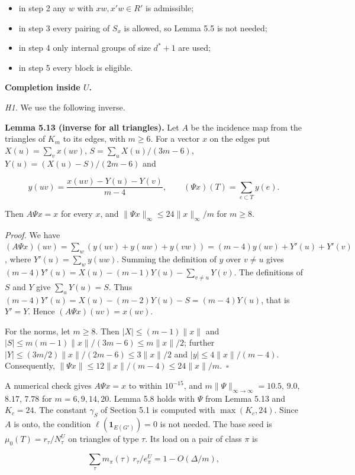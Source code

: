 \documentclass[english,11pt,a4paper]{article}
\providecommand{\tightlist}{\setlength{\itemsep}{0pt}\setlength{\parskip}{0pt}}
\begin{document}
\begin{itemize}
\tightlist
\item
  in step 2 any \(w\) with \(xw,x'w\in R'\) is admissible;
\item
  in step 3 every pairing of \(S_x\) is allowed, so Lemma 5.5 is not needed;
\item
  in step 4 only internal groups of size \(d^*+1\) are used;
\item
  in step 5 every block is eligible.
\end{itemize}

\textbf{Completion inside \(U\).}

\emph{H1.} We use the following inverse.

\textbf{Lemma 5.13 (inverse for all triangles).} Let \(A\) be the incidence map from the triangles of \(K_m\) to its edges, with \(m\ge6\). For a vector \(x\) on the edges put \(X(u)=\sum_vx(uv)\), \(S=\sum_uX(u)/(3m-6)\), \(Y(u)=(X(u)-S)/(2m-6)\) and

\nopagebreak[4]
\[y(uv)=\frac{x(uv)-Y(u)-Y(v)}{m-4},\qquad(\Psi x)(T)=\sum_{e\subset T}y(e).\]

Then \(A\Psi x=x\) for every \(x\), and \(\|\Psi x\|_\infty\le24\|x\|_\infty/m\) for \(m\ge8\).

\emph{Proof.} We have \((A\Psi x)(uv)=\sum_w(y(uv)+y(uw)+y(vw))=(m-4)y(uv)+Y'(u)+Y'(v)\), where \(Y'(u)=\sum_wy(uw)\). Summing the definition of \(y\) over \(v\ne u\) gives \((m-4)Y'(u)=X(u)-(m-1)Y(u)-\sum_{v\ne u}Y(v)\). The definitions of \(S\) and \(Y\) give \(\sum_uY(u)=S\). Thus \((m-4)Y'(u)=X(u)-(m-2)Y(u)-S=(m-4)Y(u)\), that is \(Y'=Y\). Hence \((A\Psi x)(uv)=x(uv)\).

For the norms, let \(m\ge8\). Then \(|X|\le(m-1)\|x\|\) and \(|S|\le m(m-1)\|x\|/(3m-6)\le m\|x\|/2\); further \(|Y|\le(3m/2)\|x\|/(2m-6)\le3\|x\|/2\) and \(|y|\le4\|x\|/(m-4)\). Consequently, \(\|\Psi x\|\le12\|x\|/(m-4)\le24\|x\|/m\).~\(\square\)

A numerical check gives \(A\Psi x=x\) to within \(10^{-15}\), and \(m\|\Psi\|_{\infty\to\infty}=10.5\), \(9.0\), \(8.17\), \(7.78\) for \(m=6,9,14,20\). Lemma 5.8 holds with \(\Psi\) from Lemma 5.13 and \(K_c=24\). The constant \(\gamma_S\) of Section 5.1 is computed with \(\max(K_c,24)\). Since \(A\) is onto, the condition \(\ell(\mathbf 1_{E(G')})=0\) is not needed. The base seed is \(\mu_0(T)=r_\tau/N^U_\tau\) on triangles of type \(\tau\). Its load on a pair of class \(\pi\) is

\nopagebreak[4]
\[\sum_\tau m_\pi(\tau)\,r_\tau/e^U_\pi=1-O(\Delta/m),\]
\end{document}
